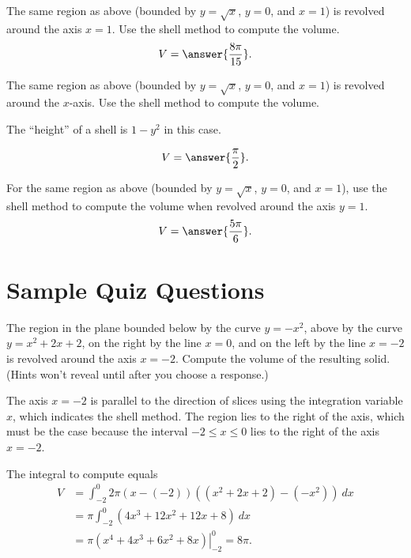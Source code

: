 \documentclass{ximera}
\begin{document}
\begin{exercise}
The same region as above (bounded by $y = \sqrt{x}$, $y=0$, and $x = 1$) is revolved around the axis $x=1$. Use the shell method to compute the volume.
\[ V = \answer{\frac{8 \pi}{15}}. \]
\end{exercise}

\begin{exercise}
The same region as above  (bounded by $y = \sqrt{x}$, $y=0$, and $x = 1$) is revolved around the $x$-axis. Use the shell method to compute the volume.
\begin{hint}
The ``height'' of a shell is $1-y^2$ in this case.
\end{hint}
\[ V = \answer{\frac{\pi}{2}}. \]
\end{exercise}

\begin{exercise}
For the same region as above (bounded by $y = \sqrt{x}$, $y=0$, and $x = 1$), use the shell method to compute the volume when revolved around the axis $y = 1$.
\[ V = \answer{\frac{5 \pi}{6}}. \]
\end{exercise}

\section*{Sample Quiz Questions}

\begin{question}%

The region in the plane bounded below by the curve \(y=-x^2\), above by the curve \(y=x^2+2x+2\), on the right by the line  \(x = 0\), and on the left by the line \(x = -2\) is revolved around the axis \(x = -2\). Compute the volume of the resulting solid.
(Hints won't reveal until after you choose a response.)
\begin{multiplechoice}
\choice{\(4\pi\)}
\choice{\(6\pi\)}
\choice[correct]{\(8\pi\)}
\choice{\(10\pi\)}
\choice{\(12\pi\)}
\choice{\(14\pi\)}
\end{multiplechoice}
\begin{feedback}
The axis \(x = -2\) is parallel to the direction of slices using the integration variable \(x\), which indicates the shell method. 
 The region lies to the right of the axis, which must be the case because the interval \(-2 \leq x \leq 0\) lies to the right of the axis \(x = -2\).
 \begin{hint}
The integral to compute equals \[ \begin{aligned} V &= \int_{-2}^{0}2 \pi (x-(-2))((x^2+2x+2)-(-x^2))~ dx\\
& = \pi \int_{-2}^{0} (4x^3+12x^2+12x+8)~ dx\\
& = \pi \left. \left(x^4+4x^3+6x^2+8x\right) \right|_{-2}^{0} = 8\pi. \end{aligned}\]
\end{hint}
\end{feedback}

\end{question}
\end{document}
